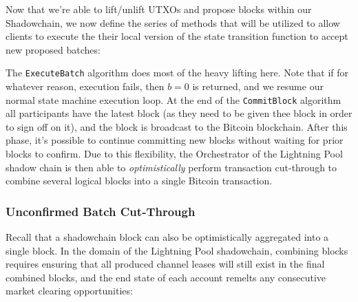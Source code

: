 \documentclass[10pt,a4paper]{article}
\theoremstyle{definition}
\begin{document}
Now that we're able to lift/unlift UTXOs and propose blocks within our
Shadowchain, we now define the series of methods that will be utilized to allow
clients to execute the their local version of the state transition function to
accept new proposed batches:
\begin{pchstack}[boxed,center, space=1em]
\end{pchstack}

The \texttt{ExecuteBatch} algorithm does most of the heavy lifting here. Note
that if for whatever reason, execution fails, then $b=0$ is returned, and we
resume our normal state machine execution loop. At the end of the
\texttt{CommitBlock} algorithm all participants have the latest block (as they
need to be given thee block in order to sign off on it), and the block is
broadcast to the Bitcoin blockchain. After this phase, it's possible to
continue committing new blocks without waiting for prior blocks to confirm. Due
to this flexibility, the Orchestrator of the Lightning Pool shadow chain is
then able to \emph{optimistically} perform transaction cut-through to combine
several logical blocks into a single Bitcoin transaction.


\subsubsection{Unconfirmed Batch Cut-Through}

Recall that a shadowchain block can also be optimistically aggregated into a
single block. In the domain of the Lightning Pool shadowchain, combining blocks
requires ensuring that all produced channel leases will still exist in the
final combined blocks, and the end state of each account remelts any
consecutive market clearing opportunities:

\begin{pchstack}[boxed,center, space=1em]
\end{pchstack}
\end{document}
